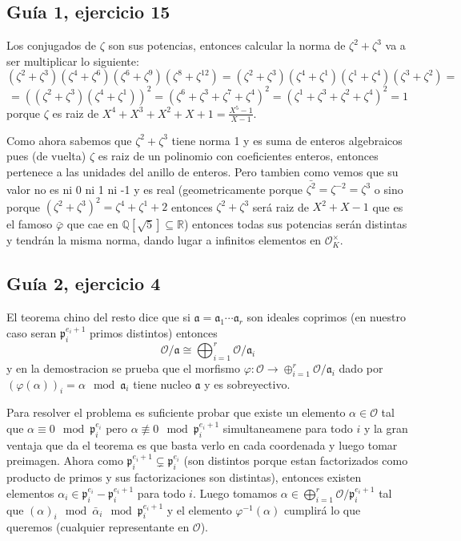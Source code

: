 \documentclass[12pt]{amsart}
\newcommand{\QQ}{\mathbb{Q}}
\newcommand{\RR}{\mathbb{R}}
\newcommand{\pp}{\mathfrak{p}}
\newcommand{\aaa}{\mathfrak{a}}
\newcommand{\OO}{\mathcal{O}}
\newcommand{\lp}{\left(}
\newcommand{\rp}{\right)}
\theoremstyle{plain}
\begin{document}
\subsection*{Guía 1, ejercicio 15}
Los conjugados de $\zeta$ son sus potencias, entonces calcular la norma
de $\zeta^2+\zeta^3$ va a ser multiplicar lo siguiente:
$$(\zeta^2+\zeta^3)(\zeta^4+\zeta^6)(\zeta^6+\zeta^9)(\zeta^8+\zeta^{12})
= (\zeta^2+\zeta^3)(\zeta^4+\zeta^1)(\zeta^1+\zeta^4)(\zeta^3+\zeta^2)=$$
$$=\lp(\zeta^2+\zeta^3)(\zeta^4+\zeta^1)\rp^2=
(\zeta^6+\zeta^3+\zeta^7+\zeta^4)^2=(\zeta^1+\zeta^3+\zeta^2+\zeta^4)^2=
1$$
porque $\zeta$ es raiz de $X^4+X^3+X^2+X+1 = \frac{X^5-1}{X-1}$.

Como ahora sabemos que $\zeta^2+\zeta^3$ tiene norma 1 y es suma de 
enteros algebraicos pues (de vuelta) $\zeta$ es raiz de un polinomio con
coeficientes enteros, entonces pertenece a las unidades del anillo de 
enteros. Pero tambien como vemos que su valor no es ni 0 ni 1 ni -1 y 
es real (geometricamente porque $\bar{\zeta^2}=\zeta^{-2} = 
\zeta^3$ o sino porque 
$(\zeta^2+\zeta^3)^2=\zeta^4+\zeta^1+2$ entonces $\zeta^2+\zeta^3$ 
será raiz de $X^2+X-1$ que es el famoso $\bar{\varphi}$ que cae en 
$\QQ[\sqrt{5}]\subseteq \RR$) entonces todas sus potencias serán 
distintas y tendrán la misma norma, dando lugar a infinitos 
elementos en $\OO_K^\times$.


\subsection*{Guía 2, ejercicio 4}

El teorema chino del resto dice que si $\aaa = \aaa_1 \cdots \aaa_r$ 
son ideales coprimos (en 
nuestro caso seran $\pp_i^{e_i+1}$ primos distintos) entonces 
$$\OO / \aaa \cong \bigoplus_{i=1}^r \OO / \aaa_i$$
y en la demostracion se prueba que el morfismo $\varphi:\OO\to
\oplus_{i=1}^r \OO / \aaa_i$ dado por $\lp\varphi(\alpha)\rp_i=\alpha\mod 
\aaa_i$ tiene nucleo $\aaa$ y es sobreyectivo.

Para resolver el problema es suficiente probar que existe un elemento 
$\alpha \in \OO$ tal que $\alpha \equiv0\mod \pp_i^{e_i}$ pero 
$\alpha \not\equiv 0 \mod \pp_i^{e_i+1}$ 
simultaneamene para todo $i$ y la gran ventaja que da el teorema es que 
basta verlo en cada coordenada y luego tomar preimagen. Ahora como 
$\pp_i^{e_i+1} \subsetneq \pp_i^{e_i}$ (son distintos porque estan 
factorizados
como producto de primos y sus factorizaciones son distintas), entonces 
existen elementos $\alpha_i \in \pp_i^{e_i} - \pp_i^{e_i+1}$ para todo $i$.
Luego tomamos $\alpha \in \bigoplus_{i=1}^r \OO / \pp_i^{e_i+1}$ tal que
$(\alpha)_i \mod \bar\alpha_i\mod \pp_i^{e_i+1}$ y el elemento $\varphi^{-1}
(\alpha)$ cumplirá lo que queremos (cualquier representante en $\OO$).
\end{document}
